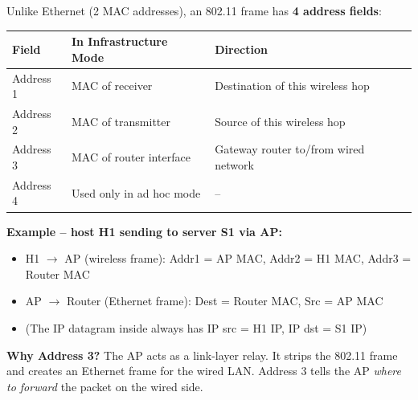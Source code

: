 \begin{keybox}
Unlike Ethernet (2 MAC addresses), an 802.11 frame has \textbf{4 address fields}:

\begin{center}
\begin{tabular}{|l|l|l|}
\hline
\textbf{Field} & \textbf{In Infrastructure Mode} & \textbf{Direction} \\
\hline
Address 1 & MAC of receiver & Destination of this wireless hop \\
Address 2 & MAC of transmitter & Source of this wireless hop \\
Address 3 & MAC of router interface & Gateway router to/from wired network \\
Address 4 & Used only in ad hoc mode & -- \\
\hline
\end{tabular}
\end{center}

\medskip
\textbf{Example -- host H1 sending to server S1 via AP:}
\begin{itemize}[noitemsep]
    \item H1 $\rightarrow$ AP (wireless frame): Addr1 = AP MAC, Addr2 = H1 MAC, Addr3 = Router MAC
    \item AP $\rightarrow$ Router (Ethernet frame): Dest = Router MAC, Src = AP MAC
    \item (The IP datagram inside always has IP src = H1 IP, IP dst = S1 IP)
\end{itemize}

\textbf{Why Address 3?} The AP acts as a link-layer relay. It strips the 802.11 frame and creates an Ethernet frame for the wired LAN. Address 3 tells the AP \emph{where to forward} the packet on the wired side.
\end{keybox}

